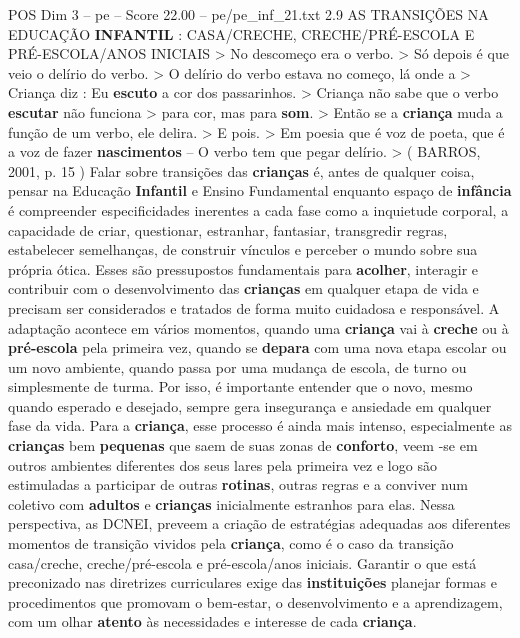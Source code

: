 \begin{textsample}{POS Dim 3 – pe – Score 22.00 – pe/pe\_inf\_21.txt}  \label{ex:f3_pos_271}
2.9 AS TRANSIÇÕES NA EDUCAÇÃO \textbf{INFANTIL} : CASA/CRECHE, CRECHE/PRÉ-ESCOLA E PRÉ-ESCOLA/ANOS INICIAIS > No descomeço era o verbo. > Só depois é que veio o delírio do verbo. > O delírio do verbo estava no começo, lá onde a > Criança diz : Eu \textbf{escuto} a cor dos passarinhos. > Criança não sabe que o verbo \textbf{escutar} não funciona > para cor, mas para \textbf{som}. > Então se a \textbf{criança} muda a função de um verbo, ele delira. > E pois. > Em poesia que é voz de poeta, que é a voz de fazer \textbf{nascimentos} – O verbo tem que pegar delírio. > ( BARROS, 2001, p. 15 ) Falar sobre transições das \textbf{crianças} é, antes de qualquer coisa, pensar na Educação \textbf{Infantil} e Ensino Fundamental enquanto espaço de \textbf{infância} é compreender especificidades inerentes a cada fase como a inquietude corporal, a capacidade de criar, questionar, estranhar, fantasiar, transgredir regras, estabelecer semelhanças, de construir vínculos e perceber o mundo sobre sua própria ótica.
Esses são pressupostos fundamentais para \textbf{acolher}, interagir e contribuir com o desenvolvimento das \textbf{crianças} em qualquer etapa de vida e precisam ser considerados e tratados de forma muito cuidadosa e responsável.
A adaptação acontece em vários momentos, quando uma \textbf{criança} vai à \textbf{creche} ou à \textbf{pré-escola} pela primeira vez, quando se \textbf{depara} com uma nova etapa escolar ou um novo ambiente, quando passa por uma mudança de escola, de turno ou simplesmente de turma.
Por isso, é importante entender que o novo, mesmo quando esperado e desejado, sempre gera insegurança e ansiedade em qualquer fase da vida.
Para a \textbf{criança}, esse processo é ainda mais intenso, especialmente as \textbf{crianças} bem \textbf{pequenas} que saem de suas zonas de \textbf{conforto}, veem -se em outros ambientes diferentes dos seus lares pela primeira vez e logo são estimuladas a participar de outras \textbf{rotinas}, outras regras e a conviver num coletivo com \textbf{adultos} e \textbf{crianças} inicialmente estranhos para elas.
Nessa perspectiva, as DCNEI, preveem a criação de estratégias adequadas aos diferentes momentos de transição vividos pela \textbf{criança}, como é o caso da transição casa/creche, creche/pré-escola e pré-escola/anos iniciais.
Garantir o que está preconizado nas diretrizes curriculares exige das \textbf{instituições} planejar formas e procedimentos que promovam o bem-estar, o desenvolvimento e a aprendizagem, com um olhar \textbf{atento} às necessidades e interesse de cada \textbf{criança}.

\end{textsample}
